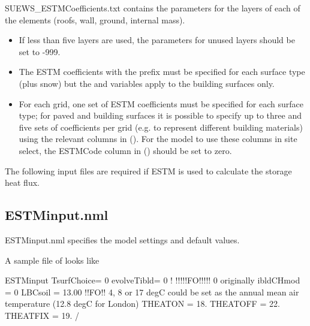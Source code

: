 \documentclass[letterpaper,10pt,english]{sphinxmanual}
\begin{document}
SUEWS\_ESTMCoefficients.txt contains the parameters for the layers of
each of the elements (roofs, wall, ground, internal mass).
\begin{itemize}
\item {} 
If less than five layers are used, the parameters for unused layers
should be set to -999.

\item {} 
The ESTM coefficients with the prefix  must be specified for
each surface type (plus snow) but the  and 
variables apply to the building surfaces only.

\item {} 
For each grid, one set of ESTM coefficients must be specified for
each surface type; for paved and building surfaces it is possible to
specify up to three and five sets of coefficients per grid (e.g. to
represent different building materials) using the relevant columns in
{\hyperref[\detokenize{input_files/SUEWS_SiteInfo/SUEWS_SiteSelect:suews-siteselect-txt}]{}} (). For the model to
use these columns in site select, the ESTMCode column in
{\hyperref[\detokenize{input_files/SUEWS_SiteInfo/SUEWS_NonVeg:suews-nonveg-txt}]{}} () should be set to zero.

\end{itemize}


The following input files are required if ESTM is used to calculate the
storage heat flux.


\subsection{ESTMinput.nml}
\label{\detokenize{input_files/ESTM_related_files/ESTM_related_files:estminput-nml}}
ESTMinput.nml specifies the model settings and default values.

A sample file of  looks like

%
\begin{sphinxVerbatim}[commandchars=\\\{\}]
\PYGZam{}ESTMinput
TsurfChoice= 0
evolveTibld= 0      ! !!!!!FO!!!!! 0 originally
ibldCHmod  = 0
LBC\PYGZus{}soil   = 13.00             !!FO!! 4, 8 or 17 degC \PYGZhy{} could be set as the annual mean air temperature (12.8 degC for London)
THEAT\PYGZus{}ON   = 18.
THEAT\PYGZus{}OFF  = 22.
THEAT\PYGZus{}FIX  = 19.
/
\end{sphinxVerbatim}
\end{document}

